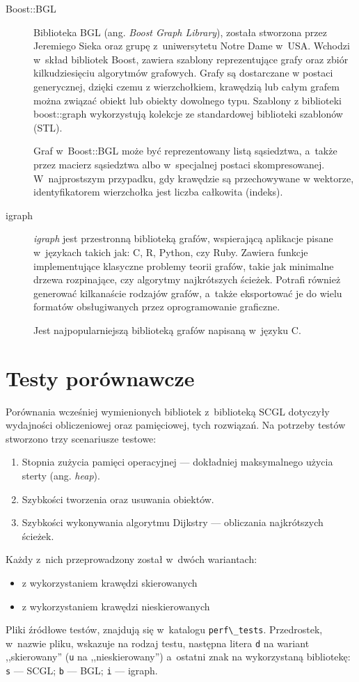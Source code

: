 \documentclass[a4paper,12pt,polish,twoside,openright]{thesis}
\newcommand\code[1]{\lstinline[style=line]{#1}}
\begin{document}
\begin{description}
\item[Boost::BGL]
Biblioteka BGL (ang. \emph{Boost Graph Library}), została stworzona przez Jeremiego Sieka oraz grupę z~uniwersytetu Notre Dame w~USA.
Wchodzi w~skład bibliotek Boost, zawiera szablony reprezentujące grafy oraz zbiór kilkudziesięciu algorytmów grafowych\cite{bgl}.
Grafy są dostarczane w postaci generycznej, dzięki czemu z wierzchołkiem, krawędzią lub całym grafem można związać obiekt lub obiekty dowolnego typu.
Szablony z biblioteki boost::graph wykorzystują kolekcje ze standardowej biblioteki szablonów (STL).

Graf w~Boost::BGL może być reprezentowany listą sąsiedztwa, a~także przez macierz sąsiedztwa albo w~specjalnej postaci skompresowanej.
W~najprostszym przypadku, gdy krawędzie są przechowywane w wektorze, identyfikatorem wierzchołka jest liczba całkowita (indeks).

\item[igraph]
\emph{igraph} jest przestronną biblioteką grafów, wspierającą aplikacje pisane w~językach takich jak: C, R, Python, czy Ruby.
Zawiera funkcje implementujące klasyczne problemy teorii grafów, takie jak minimalne drzewa rozpinające, czy algorytmy najkrótszych ścieżek.
Potrafi również generować kilkanaście rodzajów grafów, a~także eksportować je do wielu formatów obsługiwanych przez oprogramowanie graficzne\cite{igraph}.

Jest najpopularniejszą biblioteką grafów napisaną w~języku C.
\end{description}

\section{Testy porównawcze}
Porównania wcześniej wymienionych bibliotek z~biblioteką SCGL dotyczyły wydajności obliczeniowej oraz pamięciowej, tych rozwiązań.
Na potrzeby testów stworzono trzy scenariusze testowe:
\begin{enumerate}
	\item Stopnia zużycia pamięci operacyjnej --- dokładniej maksymalnego użycia sterty (ang. \emph{heap}).
	\item Szybkości tworzenia oraz usuwania obiektów.
	\item Szybkości wykonywania algorytmu Dijkstry --- obliczania najkrótszych ścieżek.
\end{enumerate}
Każdy z~nich przeprowadzony został w~dwóch wariantach:
\begin{itemize}
	\item z wykorzystaniem krawędzi skierowanych
	\item z wykorzystaniem krawędzi nieskierowanych
\end{itemize}
Pliki źródłowe testów, znajdują się w~katalogu \code{perf\_tests}.
Przedrostek, w~nazwie pliku, wskazuje na rodzaj testu, następna litera \code{d} na wariant ,,skierowany'' (\code{u} na ,,nieskierowany'') a~ostatni znak na wykorzystaną bibliotekę: \code{s} --- SCGL; \code{b} --- BGL; \code{i} --- igraph.
\end{document}
